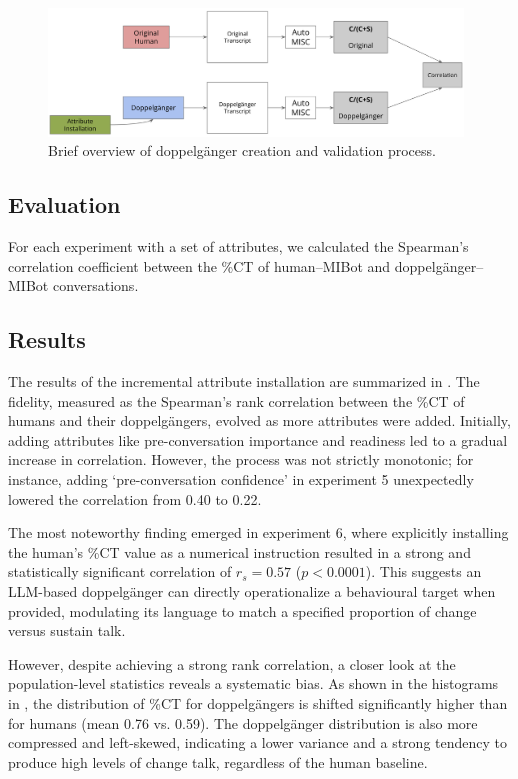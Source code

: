 \begin{figure}[htpb]
	\centering
	\includegraphics[width=0.98\textwidth]{fig/doppelganger_process.png}
	\caption[Brief overview of doppelgänger creation and validation process]{Brief overview of doppelgänger creation and validation process.}
	\label{fig:doppelgänger-creation-process}
\end{figure}

\subsection{Evaluation}
For each experiment with a set of attributes, we calculated the Spearman's correlation coefficient between the \%CT of human--MIBot and doppelgänger--MIBot conversations.



\subsection{Results}
The results of the incremental attribute installation are summarized in . The fidelity, measured as the Spearman's rank correlation between the \%CT of humans and their doppelgängers, evolved as more attributes were added. Initially, adding attributes like pre-conversation importance and readiness led to a gradual increase in correlation. However, the process was not strictly monotonic; for instance, adding `pre-conversation confidence' in experiment 5 unexpectedly lowered the correlation from 0.40 to 0.22.

The most noteworthy finding emerged in experiment 6, where explicitly installing the human's \%CT value as a numerical instruction resulted in a strong and statistically significant correlation of $r_s = 0.57$ ($p < 0.0001$). This suggests an LLM-based doppelgänger can directly operationalize a behavioural target when provided, modulating its language to match a specified proportion of change versus sustain talk.

However, despite achieving a strong rank correlation, a closer look at the population-level statistics reveals a systematic bias. As shown in the histograms in , the distribution of \%CT for doppelgängers is shifted significantly higher than for humans (mean 0.76 vs. 0.59). The doppelgänger distribution is also more compressed and left-skewed, indicating a lower variance and a strong tendency to produce high levels of change talk, regardless of the human baseline.

